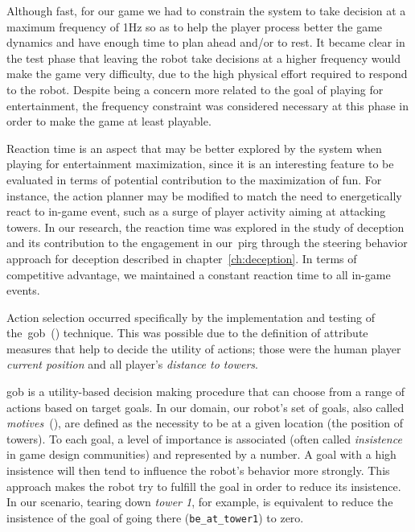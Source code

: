 Although fast, for our game we had to constrain the system to take decision at a maximum frequency of 1Hz so as to help the player process better the game dynamics and have enough time to plan ahead and/or to rest. It became clear in the test phase that leaving the robot take decisions at a higher frequency would make the game very difficulty, due to the high physical effort required to respond to the robot. Despite being a concern more related to the goal of playing for entertainment, the frequency constraint was considered necessary at this phase in order to make the game at least playable. 



Reaction time is an aspect that may be better explored by the system when playing for entertainment maximization, since it is an interesting feature to be evaluated in terms of potential contribution to the maximization of fun. For instance, the action planner may be modified to match the need to energetically react to in-game event, such as a surge of player activity aiming at attacking towers. In our research, the reaction time was explored in the study of deception and its contribution to the engagement in our~\gls{pirg} through the steering behavior approach for deception described in chapter~\ref{ch:deception}. In terms of competitive advantage, we maintained a constant reaction time to all in-game events.

Action selection occurred specifically by the implementation and testing of the~\gls{gob}~(\cite{millington_artificial_2009}) technique. This was possible due to the definition of attribute measures that help to decide the utility of actions; those were the human player \textit{current position} and all player's \textit{distance to towers}.

\glsdesc{gob} is a utility-based decision making procedure that can choose from a range of actions based on target goals. In our domain, our robot's set of goals, also called \textit{motives}~(\cite{millington_artificial_2009}), are defined as the necessity to be at a given location (the position of towers). To each goal, a level of importance is associated (often called \textit{insistence} in game design communities) and represented by a number. A goal with a high insistence will then tend to influence the robot's behavior more strongly. This approach makes the robot try to fulfill the goal in order to reduce its insistence. In our scenario, tearing down \textit{tower 1}, for example, is equivalent to reduce the insistence of the goal of going there (\verb|be_at_tower1|) to zero. 

